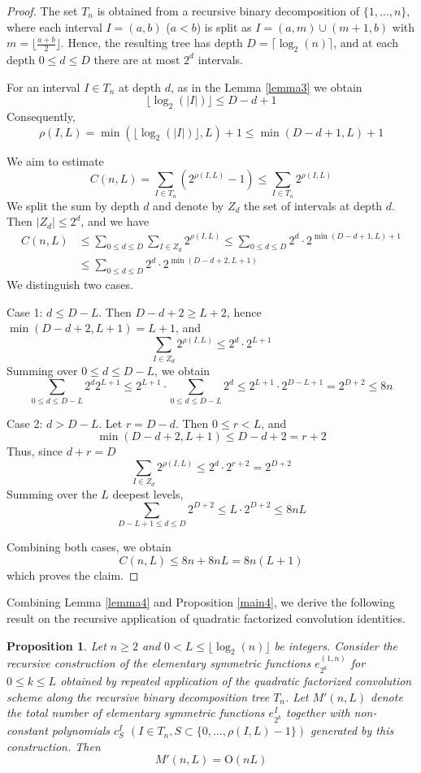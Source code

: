 \documentclass{amsart}
\newtheorem{proposition}[theorem]{Proposition}
\def\cO{{\mathrm{O}}}
\begin{document}
\begin{proof}
The set $T_n$ is obtained from a recursive binary decomposition of $\{1,\ldots,n\}$,
where each interval $I = (a,b)$ ($a < b$) is split as $I = (a,m) \cup (m+1,b)$ with
$m = \lfloor \frac{a+b}{2} \rfloor$.  Hence, the resulting tree has depth $D = \lceil \log_2(n) \rceil$,
and at each depth $0\leq d\leq D$ there are at most $2^d$ intervals.

For an interval $I\in T_n$ at depth $d$, as in the Lemma \ref{lemma3}
we obtain
\[
\lfloor \log_2(|I|) \rfloor \leq D - d + 1
\]
Consequently,
\[
\rho(I,L) = \min(\lfloor \log_2(|I|)\rfloor, L) + 1 \leq \min(D-d+1, L) + 1
\]

We aim to estimate
\[
C(n,L) = \sum_{I\in T_n} (2^{\rho(I,L)} - 1)
\leq \sum_{I\in T_n} 2^{\rho(I,L)}
\]
We split the sum by depth $d$ and denote by $Z_d$ the set of intervals at depth $d$.
Then $|Z_d|\leq 2^d$, and we have
\[
\begin{aligned}
C(n,L) &\leq \sum_{0\leq d\leq D} \sum_{I\in Z_d} 2^{\rho(I,L)}
\leq \sum_{0\leq d\leq D} 2^d \cdot 2^{\min(D-d+1, L) + 1} \\
      &\leq \sum_{0\leq d\leq D} 2^d \cdot 2^{\min(D-d+2, L+1)}
\end{aligned}
\]
We distinguish two cases.

Case 1: $d \le D-L$. Then $D - d + 2\geq L + 2$, hence $\min(D - d + 2,  L + 1) = L + 1$, and
\[
\sum_{I\in Z_d} 2^{\rho(I,L)}\leq 2^d \cdot 2^{L+1}
\]
Summing over $0\leq d\leq D-L$, we obtain
\[
\sum_{0\leq d\leq D-L} 2^d 2^{L+1} \leq 2^{L+1}\cdot \sum_{0\leq d\leq D-L} 2^d
\leq 2^{L+1} \cdot 2^{D-L+1} = 2^{D+2} \leq 8n
\]

Case 2: $d > D-L$. Let $r = D - d$. Then $0 \leq r < L$, and
\[
\min(D - d + 2, L + 1) \leq D - d + 2 = r + 2
\]
Thus, since $d + r = D$
\[
\sum_{I\in Z_d} 2^{\rho(I,L)} \leq 2^d \cdot 2^{r+2} = 2^{D+2}
\]
Summing over the $L$ deepest levels,
\[
\sum_{D-L+1\leq d\leq D} 2^{D+2} \leq L \cdot 2^{D+2} \leq 8 n L
\]

Combining both cases, we obtain
\[
C(n,L) \leq 8n + 8nL = 8 n (L + 1)
\]
which proves the claim.
\end{proof}

Combining Lemma \ref{lemma4} and Proposition \ref{main4}, we derive the following result
on the recursive application of quadratic factorized convolution identities.

\begin{proposition}
\label{main6}
Let $n\geq 2$ and $0 < L\leq \lfloor \log_2(n) \rfloor$ be integers. Consider the recursive
construction of the elementary symmetric functions $e_{2^k}^{(1,n)}$ for $0\leq k \leq L$
obtained by repeated application of the quadratic factorized convolution scheme along
the recursive binary decomposition tree $T_n$. Let $M'(n,L)$ denote the total number of
elementary symmetric functions $e_{2^k}^I$ together with non-constant polynomials
$c_S^I$ $(I\in T_n, S\subset \{0,\ldots,\rho(I,L)-1\})$ generated by this construction.
Then
\[
M'(n,L) = \cO(n L)
\]
\end{proposition}
\end{document}
